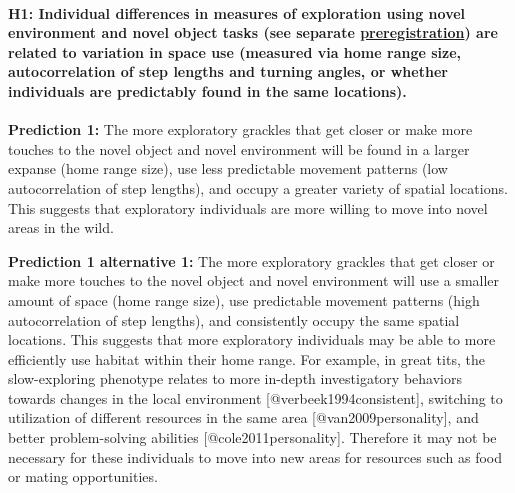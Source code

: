 \documentclass[]{article}
\let\oldparagraph\paragraph
\renewcommand{\paragraph}[1]{\oldparagraph{#1}\mbox{}}
\begin{document}
\paragraph{\texorpdfstring{H1: Individual differences in measures of
exploration using novel environment and novel object tasks (see separate
\href{http://corinalogan.com/Preregistrations/g_exploration.html}{preregistration})
are related to variation in space use (measured via home range size,
autocorrelation of step lengths and turning angles, or whether
individuals are predictably found in the same
locations).}{H1: Individual differences in measures of exploration using novel environment and novel object tasks (see separate preregistration) are related to variation in space use (measured via home range size, autocorrelation of step lengths and turning angles, or whether individuals are predictably found in the same locations).}}\label{h1-individual-differences-in-measures-of-exploration-using-novel-environment-and-novel-object-tasks-see-separate-preregistration-are-related-to-variation-in-space-use-measured-via-home-range-size-autocorrelation-of-step-lengths-and-turning-angles-or-whether-individuals-are-predictably-found-in-the-same-locations.}

\textbf{Prediction 1:} The more exploratory grackles that get closer or
make more touches to the novel object and novel environment will be
found in a larger expanse (home range size), use less predictable
movement patterns (low autocorrelation of step lengths), and occupy a
greater variety of spatial locations. This suggests that exploratory
individuals are more willing to move into novel areas in the wild.

\textbf{Prediction 1 alternative 1:} The more exploratory grackles that
get closer or make more touches to the novel object and novel
environment will use a smaller amount of space (home range size), use
predictable movement patterns (high autocorrelation of step lengths),
and consistently occupy the same spatial locations. This suggests that
more exploratory individuals may be able to more efficiently use habitat
within their home range. For example, in great tits, the slow-exploring
phenotype relates to more in-depth investigatory behaviors towards
changes in the local environment {[}@verbeek1994consistent{]}, switching
to utilization of different resources in the same area
{[}@van2009personality{]}, and better problem-solving abilities
{[}@cole2011personality{]}. Therefore it may not be necessary for these
individuals to move into new areas for resources such as food or mating
opportunities.
\end{document}
